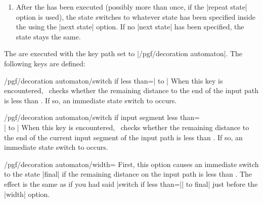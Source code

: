 \begin{command}{\pgfdeclaredecoration{}}
\begin{command}{\state{}}
\begin{enumerate}
\begin{codeexample}[]
\tikz\path[decorate, decoration=stars, star point ratio=2, star points=5,
           inner sep=0, minimum size=rnd*10pt+2pt]            
  (0,0) .. controls (0,2)  and (3,2)  .. (3,0)
        .. controls (3,-3) and (0,0)  .. (0,-3)
        .. controls (0,-5) and (3,-5) .. (3,-3);
\end{codeexample}

    \item
      After the  has been executed (possibly more than
      once, if the |repeat state| option is used), the state switches to
      whatever state has been specified inside the 
      using the |next state| option. If no |next state| has been
      specified, the state stays the same.
    \end{enumerate}

    The  are executed with the key path set to
    |/pgf/decoration automaton|. The following keys are defined:
    \begin{key}{/pgf/decoration automaton/switch if less than=| to |}
      When this key is encountered, \pgfname\ checks whether the
      remaining distance to the end of the input path is less than
      . If so, an immediate state switch to  occurs.
    \end{key}
    \begin{key}{/pgf/decoration automaton/switch if input segment less than=\\| to |}
      When this key is encountered, \pgfname\ checks whether the
      remaining distance to the end of the current input segment of the
      input path is less than . If so, an immediate
      state switch to  occurs.
    \end{key}
    \begin{key}{/pgf/decoration automaton/width=}
      First, this option causes an immediate switch to the
      state |final| if the remaining distance on the input path is
      less than . The effect is the same as if you had
      said |switch if less than=|| to final| just
      before the |width| option.


\end{key}
\end{command}
\end{command}
